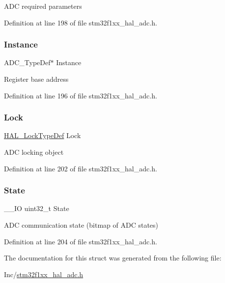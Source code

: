 A\+DC required parameters 

Definition at line 198 of file stm32f1xx\+\_\+hal\+\_\+adc.\+h.

\mbox{\label{struct_a_d_c___handle_type_def_abfce5509f2d1f9d3ef9012b7b7b528fa}} 
\subsubsection{\texorpdfstring{Instance}{Instance}}
{\footnotesize\ttfamily A\+D\+C\+\_\+\+Type\+Def$\ast$ Instance}

Register base address 

Definition at line 196 of file stm32f1xx\+\_\+hal\+\_\+adc.\+h.

\mbox{\label{struct_a_d_c___handle_type_def_ad4cf225029dbefe8d3fe660c33b8bb6b}} 
\subsubsection{\texorpdfstring{Lock}{Lock}}
{\footnotesize\ttfamily \hyperlink{stm32f1xx__hal__def_8h_ab367482e943333a1299294eadaad284b}{H\+A\+L\+\_\+\+Lock\+Type\+Def} Lock}

A\+DC locking object 

Definition at line 202 of file stm32f1xx\+\_\+hal\+\_\+adc.\+h.

\mbox{\label{struct_a_d_c___handle_type_def_ae822ffccdec1899d5cfcbab448119810}} 
\subsubsection{\texorpdfstring{State}{State}}
{\footnotesize\ttfamily \+\_\+\+\_\+\+IO uint32\+\_\+t State}

A\+DC communication state (bitmap of A\+DC states) 

Definition at line 204 of file stm32f1xx\+\_\+hal\+\_\+adc.\+h.



The documentation for this struct was generated from the following file\+:\begin{DoxyCompactItemize}
\item 
Inc/\hyperlink{stm32f1xx__hal__adc_8h}{stm32f1xx\+\_\+hal\+\_\+adc.\+h}\end{DoxyCompactItemize}
